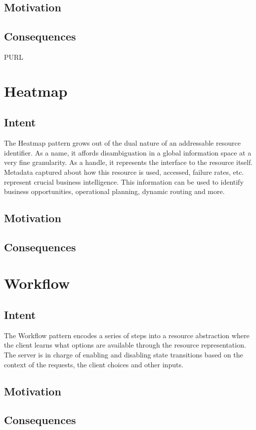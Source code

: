 \subsection{Motivation}
\label{ch03.sec.3.motivation}

\subsection{Consequences}
\label{ch03.sec.3.consequences}

PURL

\newpage
\section{Heatmap}
\label{ch03.sec.4}

\subsection{Intent}
\label{ch03.sec.4.intent}
The Heatmap pattern grows out of the dual nature of an addressable resource identifier. As a name, it affords disambiguation in a global information space at a very fine granularity. As a handle, it represents the interface to the resource itself. Metadata captured about how this resource is used, accessed, failure rates, etc. represent crucial business intelligence. This information can be used to identify business opportunities, operational planning, dynamic routing and more.

\subsection{Motivation}
\label{ch03.sec.4.motivation}

\subsection{Consequences}
\label{ch03.sec.4.consequences}

\newpage
\section{Workflow}
\label{ch03.sec.5}

\subsection{Intent}
\label{ch03.sec.5.intent}
The Workflow pattern encodes a series of steps into a resource abstraction where the client learns what options are available through the resource representation. The server is in charge of enabling and disabling state transitions based on the context of the requests, the client choices and other inputs.

\subsection{Motivation}
\label{ch03.sec.5.motivation}

\subsection{Consequences}
\label{ch03.sec.5.consequences}

